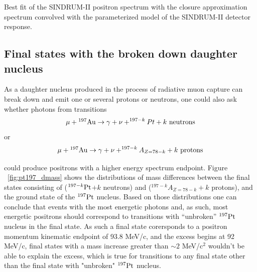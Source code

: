 \documentclass[12pt]{article}
\newcommand {\Au}[1]     {\mbox{$\rm ^{#1}Au$}}                 %
\begin{document}
\vspace{0.1in}
 {
  \label{fig:ana_step2_ppos_best_fit}
  Best fit of the SINDRUM-II positron spectrum with the closure approximation
  spectrum convolved with the parameterized model of the SINDRUM-II detector
  response.
}
\vspace{0.1in}

\subsection{Final states with the broken down daughter nucleus}

As a daughter nucleus produced in the process of radiative muon capture can
break down and emit one or several protons or neutrons, one could also ask
whether photons from transitions
$$
\mu + \Au{197} \rightarrow \gamma + \nu + ^{197-k}Pt + k \rm ~neutrons
$$
or 
$$
\mu + \Au{197} \rightarrow \gamma + \nu + ^{197-k}A_{Z=78-k} + k \rm ~protons
$$

could produce positrons with a higher energy spectrum endpoint.
Figure ~\ref{fig:pt197_dmass} shows the distributions of mass differences
between the final states consisting of ($^{197-k} \rm Pt$$ + k$ neutrons) and 
($^{197-k}A_{Z=78-k} + k$ protons),
and the ground state of the $^{197} \rm Pt$ nucleus.
Based on those distributions one can conclude that events with the most energetic photons
and, as such, most energetic positrons should correspond to transitions with ``unbroken''
$^{197} \rm Pt$ nucleus in the final state.
As such a final state corersponds to a positron momentum kinematic endpoint of 93.8 MeV/c,
and the excess begins at 92 MeV/c, final states with a mass increase greater
than $\sim 2$ MeV/c$^2$ wouldn't be able to explain the excess, which is true for
transitions to any final state other than the final state with "unbroken" $^{197} \rm Pt$
nucleus.
\end{document}
